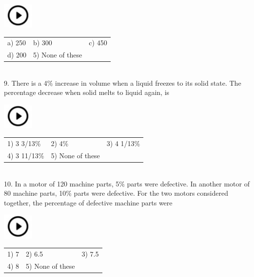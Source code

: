 \documentclass{article}
\begin{document}
\noindent   \includegraphics*[width=0.60in, height=0.52in]{images/image1} 
\begin{tabular}{p{1.7in} p{1.6in} p{1.6in}} \\ 
 a) 250          &    b) 300           &    c) 450           \\
	d) 200    &  5) None of these \\
\end{tabular}
                                                             
\noindent \\


9.   There is a 4\% increase in volume when a liquid freezes to its solid state. The percentage  decrease when solid melts to liquid again, is

\noindent   \includegraphics*[width=0.60in, height=0.52in]{images/image1} 

\begin{tabular}{p{1.7in} p{1.6in} p{1.6in}} \\ 
1) 3 3/13\%           &   2) 4\%          &    3) 4 1/13\%           \\
 4) 3 11/13\%    &  5) None of these\\
\end{tabular}
                                      

\noindent \\
10. In a motor of 120 machine parts, 5\% parts were defective. In another motor of 80 machine parts, 10\% parts were defective. For the two motors considered together, the percentage of defective machine parts were

\noindent 

\noindent   \includegraphics*[width=0.60in, height=0.52in]{images/image1}   
\begin{tabular}{p{1.7in} p{1.6in} p{1.6in}} \\ 
	1) 7           &  2) 6.5        &    3) 7.5             \\
	  4) 8    & 5) None of these\\
\end{tabular}
                                                                     
\end{document}

